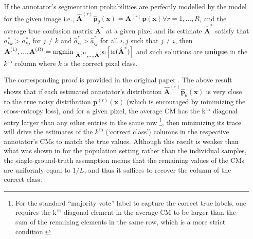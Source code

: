 \begin{theorem}\label{theorem:main}  
If the annotator's segmentation probabilities are perfectly modelled by the model for the given image i.e., $\hat{\textbf{A}}^{(r)}\hat{\textbf{p}}_\theta(\textbf{x})=\textbf{A}^{(r)}\textbf{p}(\textbf{x}) \forall r=1,...,R$, and the average true confusion matrix $\textbf{A}^{*}$ at a given pixel and its estimate $\hat{\textbf{A}}^{*}$ satisfy that $a^*_{kk} > a^*_{kj}$ for $j \neq k$ and $\hat{a}^*_{ii} > \hat{a}^*_{ij}$ for all $i, j$ such that $j \neq i$, then  $\textbf{A}^{(1)}, ..., \textbf{A}^{(R)} = \text{argmin }_{\hat{\textbf{A}}^{(1)}, ..., \hat{\textbf{A}}^{(R)}}\Big{[}\text{tr}(\hat{\textbf{A}}^{*})\Big{]}$ and such solutions are \textbf{unique} in the $k^{\text{th}}$ column where $k$ is the correct pixel class.



\end{theorem}
\vspace{2mm}
The corresponding proof is provided in the original paper \cite{zhang2020disentangling}. The above result shows that if each estimated annotator's distribution $\hat{\textbf{A}}^{(r)}\hat{\textbf{p}}_{\theta}(\mathbf{x})$ is very close to the true noisy distribution $\textbf{p}^{(r)}(\mathbf{x})$ (which is encouraged by minimizing the cross-entropy loss), and for a given pixel, the average CM has the k$^{\text{th}}$ diagonal entry larger than any other entries in the same row \footnote{\footnotesize For the standard ``majority vote'' label to capture the correct true labels, one requires the k$^{\text{th}}$ diagonal element in the average CM to be larger than the sum of the remaining elements in the same row, which is a more strict condition.}, then minimizing its trace will drive the estimates of the $k^{\text{th}}$ (`correct class') columns in the respective annotator's CMs to match the true values. Although this result is weaker than what was shown in \cite{tanno2019learning} for the population setting rather than the individual samples, the single-ground-truth assumption means that the remaining values of the CMs are uniformly equal to $1/L$, and thus it suffices to recover the column of the correct class.  


